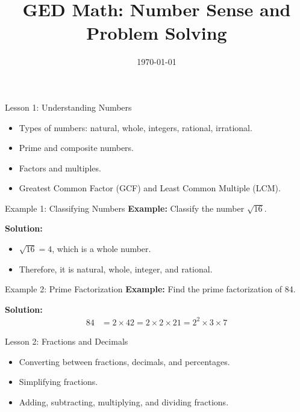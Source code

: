 \documentclass{beamer}
\title{GED Math: Number Sense and Problem Solving}
\date{\today}
\begin{document}
\frame{\titlepage}


\begin{frame}{Lesson 1: Understanding Numbers}
\begin{itemize}
    \item Types of numbers: natural, whole, integers, rational, irrational.
    \item Prime and composite numbers.
    \item Factors and multiples.
    \item Greatest Common Factor (GCF) and Least Common Multiple (LCM).
\end{itemize}
\end{frame}

\begin{frame}{Example 1: Classifying Numbers}
\textbf{Example:} Classify the number $\sqrt{16}$.

\textbf{Solution:}
\begin{itemize}
    \item $\sqrt{16} = 4$, which is a whole number.
    \item Therefore, it is natural, whole, integer, and rational.
\end{itemize}
\end{frame}

\begin{frame}{Example 2: Prime Factorization}
\textbf{Example:} Find the prime factorization of 84.

\textbf{Solution:}
\begin{align*}
84 &= 2 \times 42 = 2 \times 2 \times 21 = 2^2 \times 3 \times 7
\end{align*}
\end{frame}


\begin{frame}{Lesson 2: Fractions and Decimals}
\begin{itemize}
    \item Converting between fractions, decimals, and percentages.
    \item Simplifying fractions.
    \item Adding, subtracting, multiplying, and dividing fractions.
\end{itemize}
\end{frame}
\end{document}
